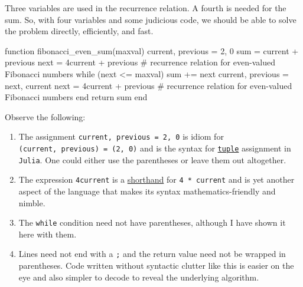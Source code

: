 \documentclass[
  a4paper,
]{article}
\newenvironment{Shaded}{\begin{snugshade}}{\end{snugshade}}
\newcommand{\CommentTok}[1]{\textcolor[rgb]{0.50,0.62,0.50}{#1}}
\newcommand{\ControlFlowTok}[1]{\textcolor[rgb]{0.94,0.87,0.69}{#1}}
\newcommand{\FloatTok}[1]{\textcolor[rgb]{0.75,0.75,0.82}{#1}}
\newcommand{\FunctionTok}[1]{\textcolor[rgb]{0.94,0.94,0.56}{#1}}
\newcommand{\KeywordTok}[1]{\textcolor[rgb]{0.94,0.87,0.69}{#1}}
\newcommand{\NormalTok}[1]{\textcolor[rgb]{0.80,0.80,0.80}{#1}}
\newcommand{\OperatorTok}[1]{\textcolor[rgb]{0.94,0.94,0.82}{#1}}
\begin{document}
Three variables are used in the recurrence relation. A fourth is needed
for the sum. So, with four variables and some judicious code, we should
be able to solve the problem directly, efficiently, and fast.

\begin{Shaded}
\begin{Highlighting}[]
\KeywordTok{function} \FunctionTok{fibonacci\_even\_sum}\NormalTok{(maxval)}
\NormalTok{  current, previous }\OperatorTok{=} \FloatTok{2}\NormalTok{, }\FloatTok{0}
\NormalTok{  sum }\OperatorTok{=}\NormalTok{ current }\OperatorTok{+}\NormalTok{ previous}
\NormalTok{  next }\OperatorTok{=} \FloatTok{4}\NormalTok{current }\OperatorTok{+}\NormalTok{ previous }\CommentTok{\# recurrence relation for even{-}valued Fibonacci numbers}
  \ControlFlowTok{while}\NormalTok{ (next }\OperatorTok{\textless{}=}\NormalTok{ maxval)}
\NormalTok{    sum }\OperatorTok{+=}\NormalTok{ next}
\NormalTok{    current, previous }\OperatorTok{=}\NormalTok{ next, current}
\NormalTok{    next }\OperatorTok{=} \FloatTok{4}\NormalTok{current }\OperatorTok{+}\NormalTok{ previous }\CommentTok{\# recurrence relation for even{-}valued Fibonacci numbers}
  \ControlFlowTok{end}
  \ControlFlowTok{return}\NormalTok{ sum}
\KeywordTok{end}
\end{Highlighting}
\end{Shaded}

Observe the following:

\begin{enumerate}
\item
  The assignment \texttt{current,\ previous\ =\ 2,\ 0} is idiom for
  \texttt{(current,\ previous)\ =\ (2,\ 0)} and is the syntax for
  \href{https://discourse.julialang.org/t/correct-way-to-do-multiple-variable-assignments/30242}{\texttt{tuple}}
  assignment in \texttt{Julia}. One could either use the parentheses or
  leave them out altogether.
\item
  The expression \texttt{4current} is a
  \href{https://docs.julialang.org/en/v1/manual/integers-and-floating-point-numbers/\#man-numeric-literal-coefficients}{shorthand}
  for \texttt{4\ *\ current} and is yet another aspect of the language
  that makes its syntax mathematics-friendly and nimble.
\item
  The \texttt{while} condition need not have parentheses, although I
  have shown it here with them.
\item
  Lines need not end with a \texttt{;} and the return value need not be
  wrapped in parentheses. Code written without syntactic clutter like
  this is easier on the eye and also simpler to decode to reveal the
  underlying algorithm.
\end{enumerate}
\end{document}
